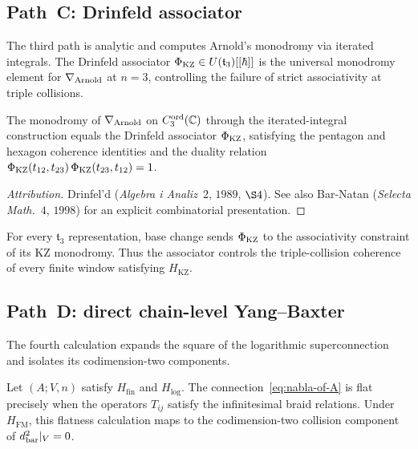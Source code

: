 \subsection{Path~C: Drinfeld associator}
\label{ssec:climax-platonic-path-C-drinfeld}

The third path is analytic and computes Arnold's monodromy via
iterated integrals. The Drinfeld associator $\Phi_{\mathrm{KZ}} \in U(\mathfrak{t}_3)
[[\hbar]]$ is the universal monodromy element for $\nabla_{\mathrm{Arnold}}$ at
$n = 3$, controlling the failure of strict associativity at triple
collisions.

\begin{theorem}[Drinfeld $1989$]
\label{thm:drinfeld-associator-platonic}
\ClaimStatusProvedElsewhere
The monodromy of $\nabla_{\mathrm{Arnold}}$ on $C_3^{\mathrm{ord}}(\mathbb{C})$
through the iterated-integral construction equals the Drinfeld
associator $\Phi_{\mathrm{KZ}}$, satisfying the pentagon and hexagon coherence
identities and the duality relation
$\Phi_{\mathrm{KZ}}(t_{12}, t_{23})\,\Phi_{\mathrm{KZ}}(t_{23}, t_{12}) = 1$.
\end{theorem}

\begin{proof}[Attribution]
Drinfel'd (\textit{Algebra i Analiz}~$2$, $1989$, $\S 4$). See also
Bar-Natan (\textit{Selecta Math.}~$4$, $1998$) for an explicit
combinatorial presentation.
\end{proof}

\begin{remark}
\label{rem:path-C-closure-platonic}
For every $\mathfrak t_3$ representation, base change sends
$\Phi_{\mathrm{KZ}}$ to the associativity constraint of its KZ monodromy.
Thus the associator controls the triple-collision coherence of every
finite window satisfying $H_{\mathrm{KZ}}$.
\end{remark}

\subsection{Path~D: direct chain-level Yang--Baxter}
\label{ssec:climax-platonic-path-D-direct}

The fourth calculation expands the square of the logarithmic
superconnection and isolates its codimension-two components.

\begin{proposition}
\label{prop:cybe-equivalence-platonic}
\ClaimStatusConditional
Let $(A;V,n)$ satisfy $H_{\mathrm{fin}}$ and $H_{\log}$.  The
connection~\eqref{eq:nabla-of-A} is flat precisely when the operators
$T_{ij}$ satisfy the infinitesimal braid relations.  Under
$H_{\mathrm{FM}}$, this flatness calculation maps to the
codimension-two collision component of $d_{\mathrm{bar}}^2|_V=0$.
\end{proposition}


